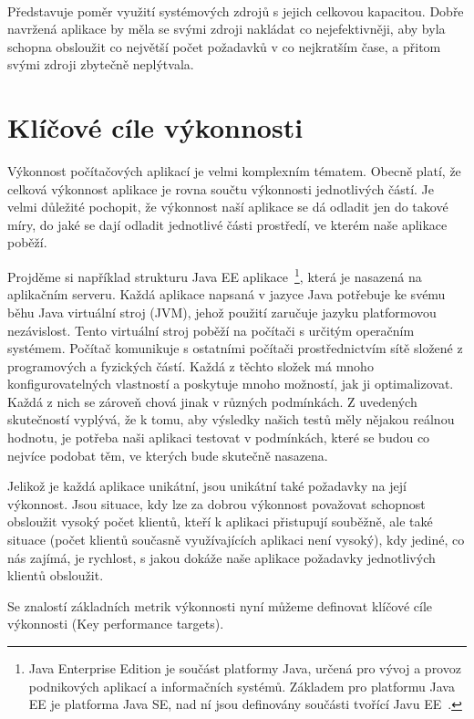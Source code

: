 \documentclass[122pt,oneside]{fithesis}
\begin{document}
\vspace{5 mm}
\\\indent Představuje poměr využití systémových zdrojů s jejich celkovou kapacitou. Dobře navržená aplikace by měla se svými zdroji nakládat co nejefektivněji, aby byla schopna obsloužit co největší počet požadavků v co nejkratším čase, a přitom svými zdroji zbytečně neplýtvala.

\section{Klíčové cíle výkonnosti}
Výkonnost počítačových aplikací je velmi komplexním tématem. Obecně platí, že celková výkonnost aplikace je rovna součtu výkonnosti jednotlivých částí. Je velmi důležité pochopit, že výkonnost naší aplikace se dá odladit jen do takové míry, do jaké se dají odladit jednotlivé části prostředí, ve kterém naše aplikace poběží. 

Projděme si například strukturu Java EE aplikace~\footnote{Java Enterprise Edition je součást platformy Java, určená pro vývoj a provoz podnikových aplikací a informačních systémů. Základem pro platformu Java EE je platforma Java SE, nad ní jsou definovány součásti tvořící Javu EE~\cite{wikiJavaEE}.}, která je nasazená na aplikačním serveru. Každá aplikace napsaná v jazyce Java potřebuje ke svému běhu Java virtuální stroj (JVM), jehož použití zaručuje jazyku platformovou nezávislost. Tento virtuální stroj poběží na počítači s určitým operačním systémem. Počítač komunikuje s ostatními počítači prostřednictvím sítě složené z programových a fyzických částí. Každá z těchto složek má mnoho konfigurovatelných vlastností a poskytuje mnoho možností, jak ji optimalizovat. Každá z nich se zároveň chová jinak v různých podmínkách. Z uvedených skutečností vyplývá, že k tomu, aby výsledky našich testů měly nějakou reálnou hodnotu, je potřeba naši aplikaci testovat v podmínkách, které se budou co nejvíce podobat těm, ve kterých bude skutečně nasazena.

Jelikož je každá aplikace unikátní, jsou unikátní také požadavky na její výkonnost. Jsou situace, kdy lze za dobrou výkonnost považovat schopnost obsloužit vysoký počet klientů, kteří k aplikaci přistupují souběžně, ale také situace (počet klientů současně využívajících aplikaci není vysoký), kdy jediné, co nás zajímá, je rychlost, s jakou dokáže naše aplikace požadavky jednotlivých klientů obsloužit.
 
Se znalostí základních metrik výkonnosti nyní můžeme definovat klíčové cíle výkonnosti (Key performance targets).
\end{document}
